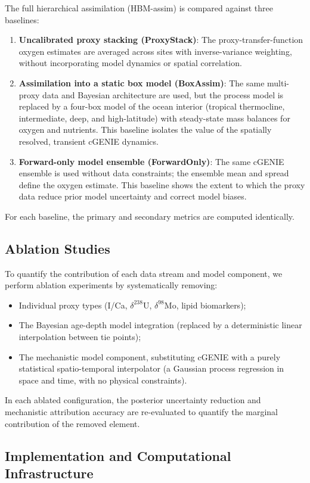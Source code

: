 \documentclass{article}
\begin{document}
The full hierarchical assimilation (HBM-assim) is compared against three baselines:
\begin{enumerate}
    \item \textbf{Uncalibrated proxy stacking (ProxyStack)}: The proxy-transfer-function oxygen estimates are averaged across sites with inverse-variance weighting, without incorporating model dynamics or spatial correlation.
    \item \textbf{Assimilation into a static box model (BoxAssim)}: The same multi-proxy data and Bayesian architecture are used, but the process model is replaced by a four-box model of the ocean interior (tropical thermocline, intermediate, deep, and high-latitude) with steady-state mass balances for oxygen and nutrients. This baseline isolates the value of the spatially resolved, transient cGENIE dynamics.
    \item \textbf{Forward-only model ensemble (ForwardOnly)}: The same cGENIE ensemble is used without data constraints; the ensemble mean and spread define the oxygen estimate. This baseline shows the extent to which the proxy data reduce prior model uncertainty and correct model biases.
\end{enumerate}
For each baseline, the primary and secondary metrics are computed identically.

\subsection{Ablation Studies}

To quantify the contribution of each data stream and model component, we perform ablation experiments by systematically removing:
\begin{itemize}
    \item Individual proxy types (I/Ca, $\delta^{238}$U, $\delta^{98}$Mo, lipid biomarkers);
    \item The Bayesian age-depth model integration (replaced by a deterministic linear interpolation between tie points);
    \item The mechanistic model component, substituting cGENIE with a purely statistical spatio-temporal interpolator (a Gaussian process regression in space and time, with no physical constraints).
\end{itemize}
In each ablated configuration, the posterior uncertainty reduction and mechanistic attribution accuracy are re-evaluated to quantify the marginal contribution of the removed element.

\subsection{Implementation and Computational Infrastructure}
\end{document}
